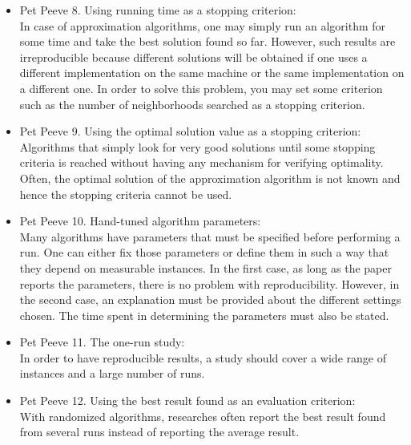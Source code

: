 \documentclass[]{scrartcl}
\begin{document}
\begin{itemize}
	\item Pet Peeve 8. Using running time as a stopping criterion: \\
	In case of approximation algorithms, one may simply run an algorithm for some time and take the best solution found so far. However, such results are irreproducible because different solutions will be obtained if one uses a different implementation on the same machine or the same implementation on a different one. In order to solve this problem, you may set some criterion such as the number of neighborhoods searched as a stopping criterion. 
	\item Pet Peeve 9. Using the optimal solution value as a stopping criterion: \\
	Algorithms that simply look for very good solutions until some stopping criteria is reached without having any mechanism for verifying optimality. Often, the optimal solution of the approximation algorithm is not known and hence the stopping criteria cannot be used.
	\item Pet Peeve 10. Hand-tuned algorithm parameters: \\
	Many algorithms have parameters that must be specified before performing a run. One can either fix those parameters or define them in such a way that they depend on measurable instances. In the first case, as long as the paper reports the parameters, there is no problem with reproducibility. However, in the second case, an explanation must be provided about the different settings chosen. The time spent in determining the parameters must also be stated.
	\item Pet Peeve 11. The one-run study: \\
	In order to have reproducible results, a study should cover a wide range of instances and a large number of runs.
	\item Pet Peeve 12. Using the best result found as an evaluation criterion: \\
	With randomized algorithms, researches often report the best result found from several runs instead of reporting the average result. 
\end{itemize}
\end{document}
